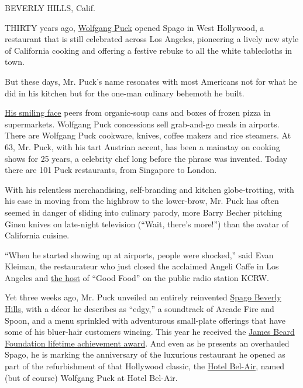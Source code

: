 BEVERLY HILLS, Calif.

THIRTY years ago,
\href{http://topics.nytimes3xbfgragh.onion/top/reference/timestopics/people/p/wolfgang_puck/index.html?8qa}{Wolfgang
Puck} opened Spago in West Hollywood, a restaurant that is still
celebrated across Los Angeles, pioneering a lively new style of
California cooking and offering a festive rebuke to all the white
tablecloths in town.

But these days, Mr. Puck's name resonates with most Americans not for
what he did in his kitchen but for the one-man culinary behemoth he
built.

\href{http://www.wolfgangpuck.com/}{His smiling face} peers from
organic-soup cans and boxes of frozen pizza in supermarkets. Wolfgang
Puck concessions sell grab-and-go meals in airports. There are Wolfgang
Puck cookware, knives, coffee makers and rice steamers. At 63, Mr. Puck,
with his tart Austrian accent, has been a mainstay on cooking shows for
25 years, a celebrity chef long before the phrase was invented. Today
there are 101 Puck restaurants, from Singapore to London.

With his relentless merchandising, self-branding and kitchen
globe-trotting, with his ease in moving from the highbrow to the
lower-brow, Mr. Puck has often seemed in danger of sliding into culinary
parody, more Barry Becher pitching Ginsu knives on late-night television
(``Wait, there's more!'') than the avatar of California cuisine.

``When he started showing up at airports, people were shocked,'' said
Evan Kleiman, the restaurateur who just closed the acclaimed Angeli
Caffe in Los Angeles and
\href{http://www.kcrw.com/people/kleiman_evan?role=host}{the host} of
``Good Food'' on the public radio station KCRW.

Yet three weeks ago, Mr. Puck unveiled an entirely reinvented
\href{http://www.wolfgangpuck.com/restaurants/fine-dining/3635}{Spago
Beverly Hills}, with a décor he describes as ``edgy,'' a soundtrack of
Arcade Fire and Spoon, and a menu sprinkled with adventurous small-plate
offerings that have some of his bluer-hair customers wincing. This year
he received the
\href{http://www.jamesbeard.org/awards/lifetime-achievement}{James Beard
Foundation lifetime achievement award}. And even as he presents an
overhauled Spago, he is marking the anniversary of the luxurious
restaurant he opened as part of the refurbishment of that Hollywood
classic, the \href{http://www.hotelbelair.com/}{Hotel Bel-Air}, named
(but of course) Wolfgang Puck at Hotel Bel-Air.

